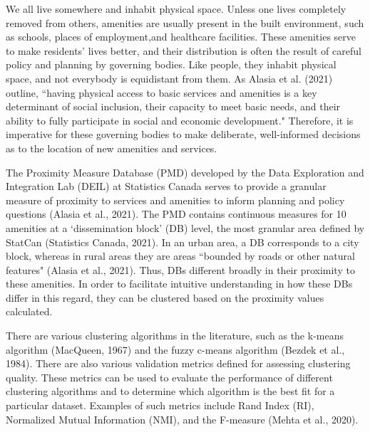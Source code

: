 \documentclass[11pt, a4paper]{article}
\begin{document}
We all live somewhere and inhabit physical space. Unless one lives completely removed from others, amenities are usually present in the built environment, such as schools, places of employment,and healthcare facilities. These amenities serve to make residents’ lives better, and their distribution is often the result of careful policy and planning by governing bodies. Like people, they inhabit physical space, and not everybody is equidistant from them. As Alasia et al. (2021) outline, ``having physical access to basic services and amenities is a key determinant of social inclusion, their capacity to meet basic needs, and their ability to fully participate in social and economic development." Therefore, it is imperative for these governing bodies to make deliberate, well-informed decisions as to the location of new amenities and services. 
\par
The Proximity Measure Database (PMD) developed by the Data Exploration and Integration Lab (DEIL) at Statistics Canada serves to provide a granular measure of proximity to services and amenities to inform planning and policy questions (Alasia et al., 2021). The PMD contains continuous measures for 10 amenities at a `dissemination block’ (DB) level, the most granular area defined by StatCan (Statistics Canada, 2021). In an urban area, a DB corresponds to a city block, whereas in rural areas they are areas “bounded by roads or other natural features" (Alasia et al., 2021). Thus, DBs different broadly in their proximity to these amenities. In order to facilitate intuitive understanding in how these DBs differ in this regard, they can be clustered based on the proximity values calculated.  
\par
There are various clustering algorithms in the literature, such as the k-means algorithm (MacQueen, 1967) and the fuzzy c-means algorithm (Bezdek et al., 1984). There are also various validation metrics defined for assessing clustering quality. These metrics can be used to evaluate the performance of different clustering algorithms and to determine which algorithm is the best fit for a particular dataset. Examples of such metrics include Rand Index (RI), Normalized Mutual Information (NMI), and the F-measure (Mehta et al., 2020).
\par
\end{document}
